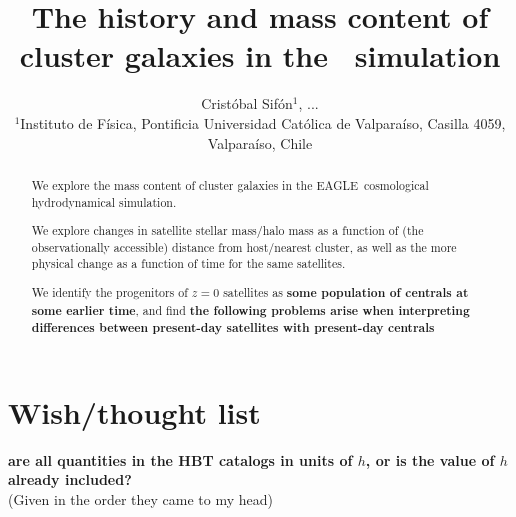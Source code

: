 \documentclass[usenatbib,fleqn]{mnras}
\title[Mass content of \eagle\ cluster galaxies]{The history and mass content of cluster galaxies in the \eagle\ simulation}
\author[C.\ Sif\'on et al.]{Crist\'obal Sif\'on$^1$, ...
\\
$^1$Instituto de F\'isica, Pontificia Universidad Cat\'olica de Valpara\'iso, Casilla 4059, Valpara\'iso, Chile
}
\newcommand{\comment}[1]{\textbf{\color{magenta} #1}}
\newcommand{\eagle}{EAGLE}
\newcommand{\Msun}{\mathrm{M}_\odot}
\begin{document}
\label{firstpage}
\pagerange{\pageref{firstpage}--\pageref{lastpage}}


\maketitle

\begin{abstract}
We explore the mass content of cluster galaxies in the \eagle\ cosmological hydrodynamical simulation. 
  
  We explore changes in satellite stellar mass/halo mass as a function of (the observationally accessible) distance from host/nearest cluster, as well as the more physical change as a function of time for the same satellites.
  
  We identify the progenitors of $z=0$ satellites as \textbf{some population of centrals at some earlier time}, and find \textbf{the following problems arise when interpreting differences between present-day satellites with present-day centrals}

\end{abstract}



\section{Wish/thought list}


\comment{are all quantities in the HBT catalogs in units of $h$, or is the value of $h$ already included?}
\\

(Given in the order they came to my head)
\end{document}
